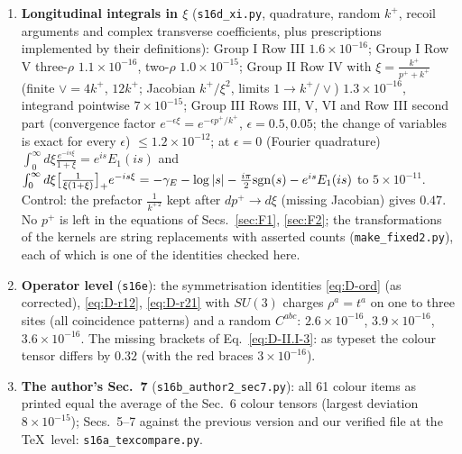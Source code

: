 \begin{enumerate}
\item \textbf{Longitudinal integrals in $\xi$} (\texttt{s16d\_xi.py}, quadrature, random $k^{+}$, recoil arguments and complex transverse coefficients, plus prescriptions implemented by their definitions): Group I Row III $1.6\times10^{-16}$; Group I Row V three-$\rho$ $1.1\times10^{-16}$, two-$\rho$ $1.0\times10^{-15}$; Group II Row IV with $\xi=\frac{k^{+}}{p^{+}+k^{+}}$ (finite $\vee=4k^{+}$, $12k^{+}$; Jacobian $k^{+}/\xi^{2}$, limits $1\to k^{+}/\vee$) $1.3\times10^{-16}$, integrand pointwise $7\times10^{-15}$; Group III Rows III, V, VI and Row III second part (convergence factor $e^{-\epsilon\xi}=e^{-\epsilon p^{+}/k^{+}}$, $\epsilon=0.5,0.05$; the change of variables is exact for every $\epsilon$) $\le1.2\times10^{-12}$; at $\epsilon=0$ (Fourier quadrature) $\int_{0}^{\infty}d\xi\frac{e^{-is\xi}}{1+\xi}=e^{is}E_{1}(is)$ and $\int_{0}^{\infty}d\xi\big[\frac{1}{\xi(1+\xi)}\big]_{+}e^{-is\xi}=-\gamma_{E}-\log|s|-\frac{i\pi}{2}{\rm sgn}(s)-e^{is}E_{1}(is)$ to $5\times10^{-11}$. Control: the prefactor $\frac{1}{k^{+\,2}}$ kept after $dp^{+}\to d\xi$ (missing Jacobian) gives $0.47$. No $p^{+}$ is left in the equations of Secs.~\ref{sec:F1}, \ref{sec:F2}; the transformations of the kernels are string replacements with asserted counts (\texttt{make\_fixed2.py}), each of which is one of the identities checked here.
\item \textbf{Operator level} (\texttt{s16e}): the symmetrisation identities \eqref{eq:D-ord} (as corrected), \eqref{eq:D-r12}, \eqref{eq:D-r21} with $SU(3)$ charges $\rho^{a}=t^{a}$ on one to three sites (all coincidence patterns) and a random $C^{abc}$: $2.6\times10^{-16}$, $3.9\times10^{-16}$, $3.6\times10^{-16}$. The missing brackets of Eq.~\eqref{eq:D-II.I-3}: as typeset the colour tensor differs by $0.32$ (with the red braces $3\times10^{-16}$).
\item \textbf{The author's Sec.~7} (\texttt{s16b\_author2\_sec7.py}): all 61 colour items as printed equal the average of the Sec.~6 colour tensors (largest deviation $8\times10^{-15}$); Secs.~5--7 against the previous version and our verified file at the \TeX\ level: \texttt{s16a\_texcompare.py}.
\end{enumerate}
